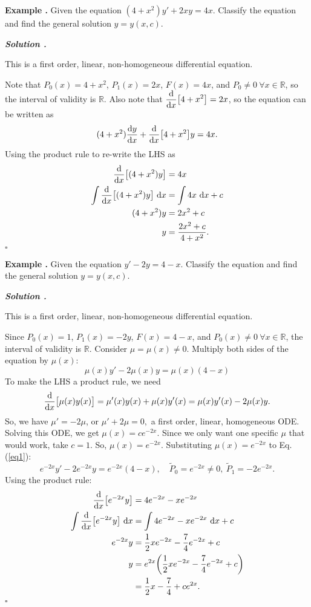 \documentclass[12pt, a4paper]{article}
\newcounter{index}[subsection]
\newenvironment*{eg}{\begin{framed}\par\noindent\textbf{Example \thesubsection.\stepcounter{index}\theindex}}{\par\end{framed}}
\newcounter{nprf}[subsection]
\newenvironment*{sol}{\par\indent\textbf{\textit{Solution \stepcounter{nprf}\thenprf.}}\par}{\hfill{$\square$}\par}
\def\R{{\mathbb{R}}}
\def\d{{\mathrm{d}}}
\def\dsst{\displaystyle}
\begin{document}
\begin{eg}
	Given the equation $(4+x^2)y'+2xy=4x$. Classify the equation and find the general solution $y=y(x,c)$.
	\begin{sol}
		This is a first order, linear, non-homogeneous differential equation.\par
		Note that $P_0(x)=4+x^2$, $P_1(x)=2x$, $F(x)=4x$, and $P_0\neq0\ \forall x\in\R$, so the interval of validity is $\R$. Also note that $\dsst\dv{x}\qty\big[4+x^2]=2x$, so the equation can be written as \[(4+x^2)\dv{y}{x}+\dv{x}\qty\big[4+x^2]y=4x.\] Using the product rule to re-write the LHS as \[\begin{aligned}\dv{x}\qty\big[(4+x^2)y]&=4x\\\int\dv{x}\qty\big[(4+x^2)y]\ \d x&=\int 4x\ \d x+c\\(4+x^2)y&=2x^2+c\\y&=\dfrac{2x^2+c}{4+x^2}.\end{aligned}\]
	\end{sol}
\end{eg}
\begin{eg}
	Given the equation $y'-2y=4-x$. Classify the equation and find the general solution $y=y(x,c)$.
	\begin{sol}
		This is a first order, linear, non-homogeneous differential equation.\par
		Since $P_0(x)=1$, $P_1(x)=-2y$, $F(x)=4-x$, and $P_0(x)\neq0\ \forall x\in\R$, the interval of validity is $\R$. Consider $\mu=\mu(x)\neq0$. Multiply both sides of the equation by $\mu(x)$: \begin{equation}\label{eq1}\mu(x)y'-2\mu(x)y=\mu(x)(4-x)\end{equation} To make the LHS a product rule, we need \[\dv{x}\qty\big[\mu(x)y(x)]=\mu'(x)y(x)+\mu(x)y'(x)=\mu(x)y'(x)-2\mu(x)y.\] So, we have $\mu'=-2\mu$, or $\mu'+2\mu=0,$ a first order, linear, homogeneous ODE. Solving this ODE, we get $\mu(x)=ce^{-2x}$. Since we only want one specific $\mu$ that would work, take $c=1$. So, $\mu(x)=e^{-2x}$. Substituting $\mu(x)=e^{-2x}$ to Eq. (\ref{eq1}): \[e^{-2x}y'-2e^{-2x}y=e^{-2x}(4-x),\quad\widetilde{P}_0=e^{-2x}\neq0,\ \widetilde{P}_1=-2e^{-2x}.\] Using the product rule: \[\begin{aligned}\dv{x}\qty[e^{-2x}y]&=4e^{-2x}-xe^{-2x}\\\int\dv{x}\qty[e^{-2x}y]\ \d x&=\int 4e^{-2x}-xe^{-2x}\ \d x+c\\e^{-2x}y&=\dfrac{1}{2}xe^{-2x}-\dfrac{7}{4}e^{-2x}+c\\y&=e^{2x}\qty(\dfrac{1}{2}xe^{-2x}-\dfrac{7}{4}e^{-2x}+c)\\&=\dfrac{1}{2}x-\dfrac{7}{4}+ce^{2x}.\end{aligned}\]
	\end{sol}
\end{eg}
\end{document}
